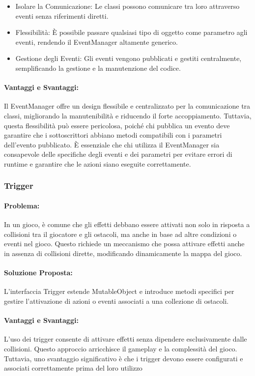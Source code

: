 \documentclass[a4paper,12pt]{report}
\begin{document}
\begin{itemize}
 \item Isolare la Comunicazione: Le classi possono comunicare tra loro attraverso eventi senza riferimenti diretti.
 \item Flessibilità: È possibile passare qualsiasi tipo di oggetto come parametro agli eventi, rendendo il EventManager altamente generico.
 \item Gestione degli Eventi: Gli eventi vengono pubblicati e gestiti centralmente, semplificando la gestione e la manutenzione del codice.
\end{itemize}

\paragraph{Vantaggi e Svantaggi:}
Il EventManager offre un design flessibile e centralizzato per la comunicazione tra classi, migliorando la manutenibilità e riducendo il forte accoppiamento. Tuttavia, questa flessibilità può essere pericolosa, poiché chi pubblica un evento deve garantire che i sottoscrittori abbiano metodi compatibili con i parametri dell’evento pubblicato. È essenziale che chi utilizza il EventManager sia consapevole delle specifiche degli eventi e dei parametri per evitare errori di runtime e garantire che le azioni siano eseguite correttamente.

\subsubsection{Trigger}
\paragraph{Problema:} In un gioco, è comune che gli effetti debbano essere attivati non solo in risposta a collisioni tra il giocatore e gli ostacoli, ma anche in base ad altre condizioni o eventi nel gioco. Questo richiede un meccanismo che possa attivare effetti anche in assenza di collisioni dirette, modificando dinamicamente la mappa del gioco.
\paragraph{Soluzione Proposta:} L’interfaccia Trigger estende MutableObject e introduce metodi specifici per gestire l’attivazione di azioni o eventi associati a una collezione di ostacoli. 
\paragraph{Vantaggi e Svantaggi:}
L’uso dei trigger consente di attivare effetti senza dipendere esclusivamente dalle collisioni. Questo approccio arricchisce il gameplay e la complessità del gioco. Tuttavia, uno svantaggio significativo è che i trigger devono essere configurati e associati correttamente prima del loro utilizzo
\end{document}
